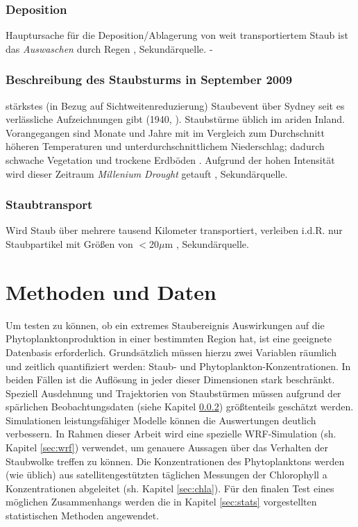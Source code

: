 \documentclass[12pt,a4paper,onecolumn,draft]{scrartcl}
\begin{document}
\subsubsection{Deposition}
Hauptursache für die Deposition/Ablagerung von weit transportiertem Staub ist das \textit{Auswaschen} durch Regen \citep{Marx.2018}, Sekundärquelle. -


\subsubsection{Beschreibung des Staubsturms in September 2009} \label{sec:reddawn}
stärkstes (in Bezug auf Sichtweitenreduzierung) Staubevent über Sydney seit es verlässliche Aufzeichnungen gibt (1940, \citet{Leys.2011}). Staubstürme üblich im ariden Inland. Vorangegangen sind Monate und Jahre mit im Vergleich zum Durchschnitt höheren Temperaturen und unterdurchschnittlichem Niederschlag; dadurch schwache Vegetation und trockene Erdböden \citep{Leys.2011}. Aufgrund der hohen Intensität wird dieser Zeitraum \textit{Millenium Drought} getauft \citep{Deckker.2014}, Sekundärquelle.

\subsubsection{Staubtransport}
Wird Staub über mehrere tausend Kilometer transportiert, verleiben i.d.R. nur Staubpartikel mit Größen von $<$20$\mu$m \citep{Marx.2018}, Sekundärquelle.

\section{Methoden und Daten} \label{sec:Methoden}
Um testen zu können, ob ein extremes Staubereignis Auswirkungen auf die Phytoplanktonproduktion in einer bestimmten Region hat, ist eine geeignete Datenbasis erforderlich. Grundsätzlich müssen hierzu zwei Variablen räumlich und zeitlich quantifiziert werden: Staub- und Phytoplankton-Konzentrationen. In beiden Fällen ist die Auflösung in jeder dieser Dimensionen stark beschränkt. Speziell Ausdehnung und Trajektorien von Staubstürmen müssen aufgrund der spärlichen Beobachtungsdaten (siehe Kapitel  \ref{sec:reddawn}) größtenteils geschätzt werden. Simulationen leistungsfähiger Modelle können die Auswertungen deutlich verbessern. In Rahmen dieser Arbeit wird eine spezielle WRF-Simulation (sh. Kapitel \ref{sec:wrf}) verwendet, um genauere Aussagen über das Verhalten der Staubwolke treffen zu können. Die Konzentrationen des Phytoplanktons werden (wie üblich) aus satellitengestützten täglichen Messungen der Chlorophyll a Konzentrationen abgeleitet (sh. Kapitel \ref{sec:chla}). Für den finalen Test eines möglichen Zusammenhangs werden die in Kapitel \ref{sec:stats} vorgestellten statistischen Methoden angewendet.
\end{document}
